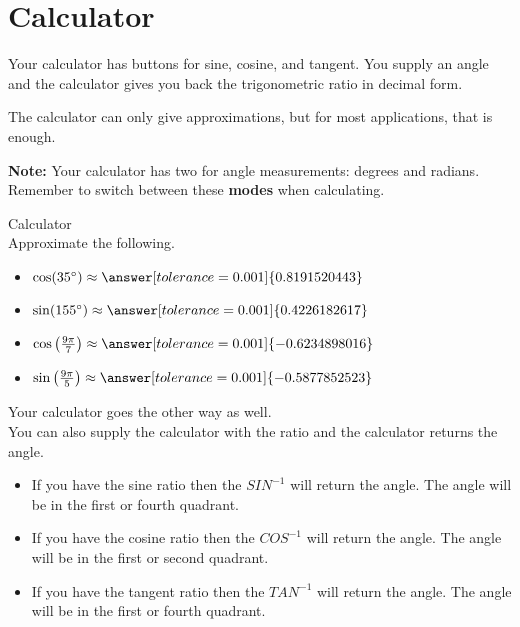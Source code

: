 \documentclass{ximera}
\begin{document}
\section*{Calculator}

Your calculator has buttons for sine, cosine, and tangent. You supply an angle and the calculator gives you back the trigonometric ratio in decimal form.

The calculator can only give approximations, but for most applications, that is enough.


\textbf{Note:}  Your calculator has two  for angle measurements: degrees and radians.  Remember to switch between these \textbf{modes} when calculating.



\begin{question} Calculator \\

Approximate the following.

\begin{itemize}
\item $\cos(35^{\circ}) \approx \answer[tolerance=0.001]{0.8191520443}$
\item $\sin(155^{\circ}) \approx \answer[tolerance=0.001]{0.4226182617}$
\item $\cos\left( \frac{9\pi}{7} \right) \approx \answer[tolerance=0.001]{-0.6234898016}$
\item $\sin\left( \frac{9\pi}{5} \right) \approx \answer[tolerance=0.001]{-0.5877852523}$
\end{itemize}

\end{question}





Your calculator goes the other way as well. \\




You can also supply the calculator with the ratio and the calculator returns the angle.

\begin{itemize}
\item If you have the sine ratio then the $SIN^{-1}$ will return the angle. The angle will be in the first or fourth quadrant.
\item If you have the cosine ratio then the $COS^{-1}$ will return the angle. The angle will be in the first or second quadrant.
\item If you have the tangent ratio then the $TAN^{-1}$ will return the angle. The angle will be in the first or fourth quadrant.
\end{itemize}
\end{document}
